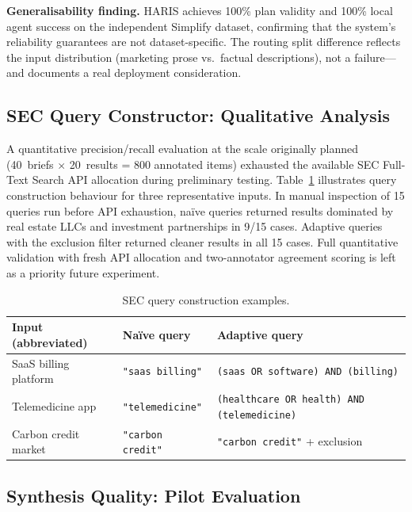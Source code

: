 \documentclass[preprint,12pt]{elsarticle}
\begin{document}
\textbf{Generalisability finding.} HARIS achieves 100\% plan validity and 100\%
local agent success on the independent Simplify dataset, confirming that the
system's reliability guarantees are not dataset-specific. The routing split
difference reflects the input distribution (marketing prose vs.\ factual
descriptions), not a failure---and documents a real deployment consideration.

\subsection{SEC Query Constructor: Qualitative Analysis}
\label{sec:sec_eval}

A quantitative precision/recall evaluation at the scale originally planned
(40~briefs $\times$ 20~results = 800 annotated items) exhausted the available
SEC Full-Text Search API allocation during preliminary testing. Table~\ref{tab:sec}
illustrates query construction behaviour for three representative inputs. In
manual inspection of 15 queries run before API exhaustion, na\"ive queries
returned results dominated by real estate LLCs and investment partnerships in
9/15 cases. Adaptive queries with the exclusion filter returned cleaner results in
all 15 cases. Full quantitative validation with fresh API allocation and
two-annotator agreement scoring is left as a priority future experiment.

\begin{table}[t]
\centering
\caption{SEC query construction examples.}
\label{tab:sec}
\begin{tabularx}{\columnwidth}{lXX}
\toprule
\textbf{Input (abbreviated)} & \textbf{Na\"{i}ve query} & \textbf{Adaptive query} \\
\midrule
SaaS billing platform & \texttt{"saas billing"} & \texttt{(saas OR software) AND (billing)} \\
Telemedicine app      & \texttt{"telemedicine"} & \texttt{(healthcare OR health) AND (telemedicine)} \\
Carbon credit market  & \texttt{"carbon credit"} & \texttt{"carbon credit"} + exclusion \\
\bottomrule
\end{tabularx}
\end{table}

\subsection{Synthesis Quality: Pilot Evaluation}
\label{sec:pilot}
\end{document}
